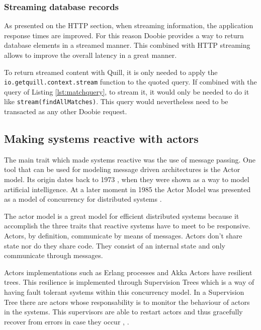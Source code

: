 \documentclass[../main.tex]{subfiles}
\begin{document}
\subsubsection{Streaming database records}
As presented on the HTTP section, when streaming information, the application
response times are improved. For this reason Doobie provides a way to return
database elements in a streamed manner. This combined with HTTP streaming allows
to improve the overall latency in a great manner.

To return streamed content with Quill, it is only needed to apply the\\
\texttt{io.getquill.context.stream} function to the quoted query. If combined
with the query of Listing \ref{lst:matchquery}, to stream it, it would only be
needed to do it like \texttt{stream(findAllMatches)}. This query would
nevertheless need to be transacted as any other Doobie request.

\subsection{Making systems reactive with actors}
The main trait which made systems reactive was the use of message passing. One
tool that can be used for modeling message driven architectures is the Actor
model. Its origin dates back to  1973 \autocite{HewittAFormalism}, when they were shown as a way to
model artificial intelligence. At a later moment in 1985 the Actor Model was
presented as a model of concurrency for distributed systems \autocite{Agha1985ACTORS:Systems}.

The
actor model is a great model for efficient distributed systems because it
accomplish the three traits that reactive systems have to meet to be responsive.
Actors, by definition, communicate by means of messages. Actors don't share state nor do they share
code. They consist of an internal state and only communicate through messages.

Actors implementations such as Erlang processes \autocite{EricssonAB2018ErlangProcesses} and Akka Actors \autocite{LightbendInc.2020AkkaActors}
have resilient trees.
This resilience is implemented through Supervision Trees which is a way of having fault tolerant systems within this
concurrency model. In a Supervision Tree there are actors whose responsability
is to monitor the behaviour of actors in the systems. This supervisors are able to
restart actors and thus gracefully recover from errors in case they occur
\autocite{ErlangBehaviour}, \autocite{SupervisionDocumentation}.
\end{document}
